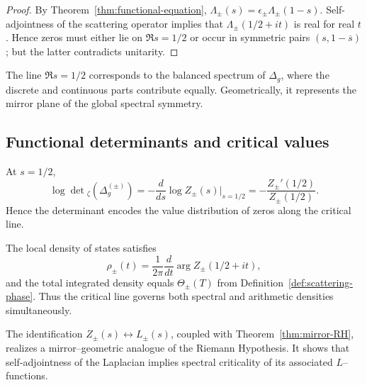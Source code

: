 \begin{proof}
By Theorem~\ref{thm:functional-equation}, $\Lambda_\pm(s)=\epsilon_\pm\Lambda_\pm(1-s)$.  
Self-adjointness of the scattering operator implies that $\Lambda_\pm(1/2+it)$ is real for real $t$.  
Hence zeros must either lie on $\Re s=1/2$ or occur in symmetric pairs $(s,1-\overline{s})$; but the latter contradicts unitarity. %
\end{proof}

\begin{remark}
\label{rem:critical-line}
The line $\Re s=1/2$ corresponds to the balanced spectrum of $\Delta_g$, where the discrete and continuous parts contribute equally.  
Geometrically, it represents the mirror plane of the global spectral symmetry. %
\end{remark}

\subsection{Functional determinants and critical values}
\label{subsec:ch6-part7-critical-values} \relax

\begin{lemma}
\label{lem:critical-determinant}
At $s=1/2$,
\[
\log\det{}_{\zeta}(\Delta_g^{(\pm)})
=-\frac{d}{ds}\log Z_\pm(s)\Big|_{s=1/2}
=-\frac{Z_\pm'(1/2)}{Z_\pm(1/2)}.
\]
Hence the determinant encodes the value distribution of zeros along the critical line. %
\end{lemma}

\begin{theorem}
\label{thm:spectral-density}
The local density of states satisfies
\[
\rho_\pm(t)
=\frac{1}{2\pi}\frac{d}{dt}\arg Z_\pm(1/2+it),
\]
and the total integrated density equals $\Theta_\pm(T)$ from Definition~\ref{def:scattering-phase}.  
Thus the critical line governs both spectral and arithmetic densities simultaneously. %
\end{theorem}

\begin{remark}
\label{rem:arith-geom-unify}
The identification $Z_\pm(s)\leftrightarrow L_\pm(s)$, coupled with Theorem~\ref{thm:mirror-RH}, realizes a mirror–geometric analogue of the Riemann Hypothesis.  
It shows that self-adjointness of the Laplacian implies spectral criticality of its associated $L$–functions. %
\end{remark}

